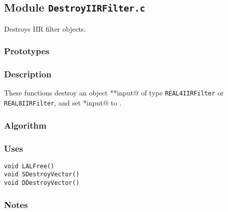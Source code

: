 
\subsection{Module \texttt{DestroyIIRFilter.c}}

Destroys IIR filter objects.

\subsubsection{Prototypes}
\vspace{0.1in}


\subsubsection{Description}

These functions destroy an object \verb@**input@ of type
\texttt{REAL4IIRFilter} or \texttt{REAL8IIRFilter}, and set
\verb@*input@ to \verb@NULL@.

\subsubsection{Algorithm}

\subsubsection{Uses}
\begin{verbatim}
void LALFree()
void SDestroyVector()
void DDestroyVector()
\end{verbatim}

\subsubsection{Notes}

